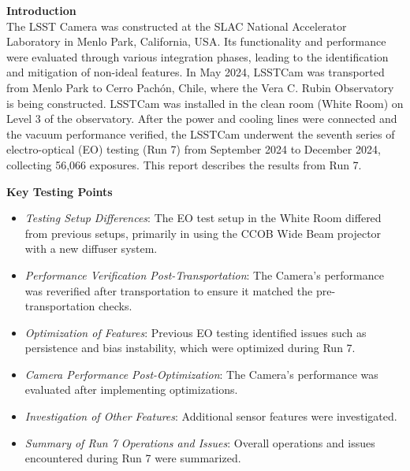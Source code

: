 \textbf{Introduction} \\
The LSST Camera \citep[LSSTCam;][]{10.71929/rubin/2571927} was constructed at the SLAC National Accelerator Laboratory in Menlo Park, California, USA. Its functionality and performance were evaluated through various integration phases, leading to the identification and mitigation of non-ideal features.
In May 2024, LSSTCam was transported from Menlo Park to Cerro Pachón, Chile, where the Vera C. Rubin Observatory is being constructed. LSSTCam was installed in the clean room (White Room) on Level 3 of the observatory. After the power and cooling lines were connected and the vacuum performance verified, the LSSTCam underwent the seventh series of electro-optical (EO) testing (Run 7) from September 2024 to December 2024, collecting 56,066 exposures. This report describes the results from Run 7.

\textbf{Key Testing Points} \\
\begin{itemize}
    \item \textit{Testing Setup Differences}: The EO test setup in the White Room differed from previous setups, primarily in using the CCOB Wide Beam projector with a new diffuser system.
    \item \textit{Performance Verification Post-Transportation}: The Camera's performance was reverified after transportation to ensure it matched the pre-transportation checks.
    \item \textit{Optimization of Features}: Previous EO testing identified issues such as persistence and bias instability, which were optimized during Run 7.
    \item \textit{Camera Performance Post-Optimization}: The Camera's performance was evaluated after implementing optimizations.
    \item \textit{Investigation of Other Features}: Additional sensor features were investigated.
    \item \textit{Summary of Run 7 Operations and Issues}: Overall operations and issues encountered during Run 7 were summarized.
\end{itemize}

